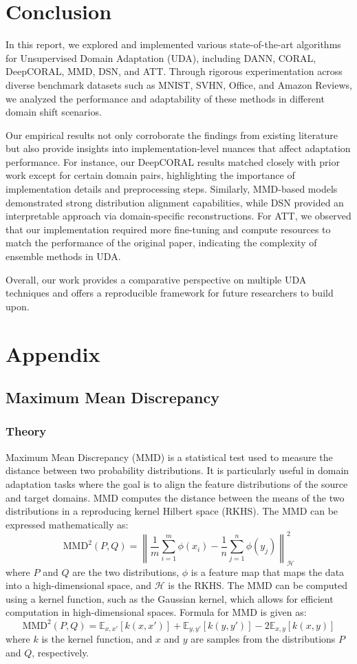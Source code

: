 \documentclass{article}
\begin{document}
\section{Conclusion}

In this report, we explored and implemented various state-of-the-art algorithms for Unsupervised Domain Adaptation (UDA), including DANN, CORAL, DeepCORAL, MMD, DSN, and ATT. Through rigorous experimentation across diverse benchmark datasets such as MNIST, SVHN, Office, and Amazon Reviews, we analyzed the performance and adaptability of these methods in different domain shift scenarios.

Our empirical results not only corroborate the findings from existing literature but also provide insights into implementation-level nuances that affect adaptation performance. For instance, our DeepCORAL results matched closely with prior work except for certain domain pairs, highlighting the importance of implementation details and preprocessing steps. Similarly, MMD-based models demonstrated strong distribution alignment capabilities, while DSN provided an interpretable approach via domain-specific reconstructions. For ATT, we observed that our implementation required more fine-tuning and compute resources to match the performance of the original paper, indicating the complexity of ensemble methods in UDA.

Overall, our work provides a comparative perspective on multiple UDA techniques and offers a reproducible framework for future researchers to build upon.

\newpage
\section*{Appendix}

\subsection*{Maximum Mean Discrepancy}
\subsubsection*{Theory}
Maximum Mean Discrepancy (MMD) is a statistical test used to measure the distance between two probability distributions. It is particularly useful in domain adaptation tasks where the goal is to align the feature distributions of the source and target domains. MMD computes the distance between the means of the two distributions in a reproducing kernel Hilbert space (RKHS). The MMD can be expressed mathematically as:
\[
  \text{MMD}^2(P, Q) = \left\| \frac{1}{m} \sum_{i=1}^{m} \phi(x_i) - \frac{1}{n} \sum_{j=1}^{n} \phi(y_j) \right\|^2_{\mathcal{H}}
\]
where \(P\) and \(Q\) are the two distributions, \(\phi\) is a feature map that maps the data into a high-dimensional space, and \(\mathcal{H}\) is the RKHS. The MMD can be computed using a kernel function, such as the Gaussian kernel, which allows for efficient computation in high-dimensional spaces. 
Formula for MMD is given as:
\[
  \text{MMD}^2(P, Q) = \mathbb{E}_{x,x'}[k(x,x')] + \mathbb{E}_{y,y'}[k(y,y')] - 2\mathbb{E}_{x,y}[k(x,y)]
\]
where \(k\) is the kernel function, and \(x\) and \(y\) are samples from the distributions \(P\) and \(Q\), respectively. 
\end{document}
